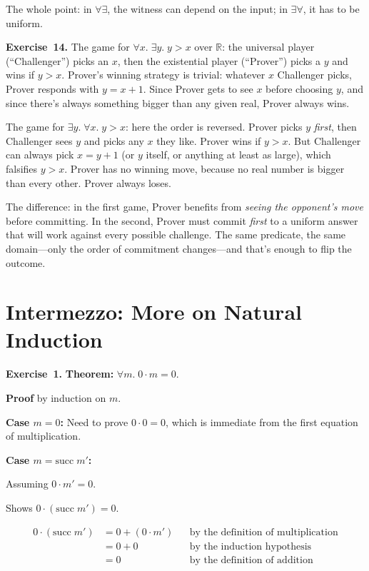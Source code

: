 \documentclass[11pt]{article}
\begin{document}
The whole point: in $\forall\exists$, the witness can depend on the input; in $\exists\forall$, it has to be uniform.

\medskip
\textbf{Exercise~14.}
The game for $\forall x.\;\exists y.\; y > x$ over $\mathbb{R}$: the universal player (``Challenger'') picks an $x$, then the existential player (``Prover'') picks a $y$ and wins if $y > x$. Prover's winning strategy is trivial: whatever $x$ Challenger picks, Prover responds with $y = x + 1$. Since Prover gets to see $x$ before choosing $y$, and since there's always something bigger than any given real, Prover always wins.

The game for $\exists y.\;\forall x.\; y > x$: here the order is reversed. Prover picks $y$ \emph{first}, then Challenger sees $y$ and picks any $x$ they like. Prover wins if $y > x$. But Challenger can always pick $x = y + 1$ (or $y$ itself, or anything at least as large), which falsifies $y > x$. Prover has no winning move, because no real number is bigger than every other. Prover always loses.

The difference: in the first game, Prover benefits from \emph{seeing the opponent's move} before committing. In the second, Prover must commit \emph{first} to a uniform answer that will work against every possible challenge. The same predicate, the same domain---only the order of commitment changes---and that's enough to flip the outcome.

\section*{Intermezzo: More on Natural Induction}

\textbf{Exercise~1.}
\textbf{Theorem:} $\forall m.\; 0 \cdot m = 0$.

\textbf{Proof} by induction on $m$.

\textbf{Case $m = 0$:} Need to prove $0 \cdot 0 = 0$, which is immediate
from the first equation of multiplication.

\textbf{Case $m = \text{succ}\; m'$:}

Assuming $0 \cdot m' = 0$.

Shows $0 \cdot (\text{succ}\; m') = 0$.

\begin{align*}
0 \cdot (\text{succ}\; m')
  &= 0 + (0 \cdot m') && \text{by the definition of multiplication} \\
  &= 0 + 0            && \text{by the induction hypothesis} \\
  &= 0                && \text{by the definition of addition}
\end{align*}
\end{document}
